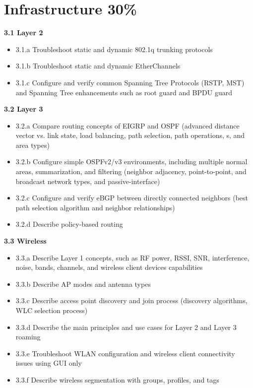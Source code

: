 \documentclass{article}
\begin{document}
\newpage
\section{Infrastructure 30\%}
\textbf{3.1 Layer 2}
\begin{itemize}
\item 3.1.a Troubleshoot static and dynamic 802.1q trunking protocols
\item 3.1.b Troubleshoot static and dynamic EtherChannels
\item 3.1.c Configure and verify common Spanning Tree Protocols (RSTP, MST) and Spanning Tree enhancements such as root guard and BPDU guard
\end{itemize}

\noindent\textbf{3.2 Layer 3}
\begin{itemize}
\item 3.2.a Compare routing concepts of EIGRP and OSPF (advanced distance vector vs. link state, load balancing, path selection, path operations, s, and area types)
\item 3.2.b Configure simple OSPFv2/v3 environments, including multiple normal areas, summarization, and filtering (neighbor adjacency, point-to-point, and broadcast network types, and passive-interface)
\item 3.2.c Configure and verify eBGP between directly connected neighbors (best path selection algorithm and neighbor relationships)
\item 3.2.d Describe policy-based routing
\end{itemize}

\noindent\textbf{3.3 Wireless}
\begin{itemize}
\item 3.3.a Describe Layer 1 concepts, such as RF power, RSSI, SNR, interference, noise, bands, channels, and wireless client devices capabilities
\item 3.3.b Describe AP modes and antenna types
\item 3.3.c Describe access point discovery and join process (discovery algorithms, WLC selection process)
\item 3.3.d Describe the main principles and use cases for Layer 2 and Layer 3 roaming
\item 3.3.e Troubleshoot WLAN configuration and wireless client connectivity issues using GUI only
\item 3.3.f Describe wireless segmentation with groups, profiles, and tags
\end{itemize}
\end{document}
